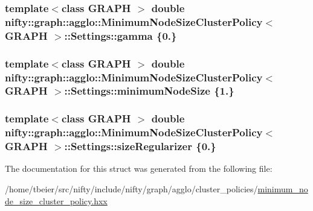 \subsubsection[{gamma}]{\setlength{\rightskip}{0pt plus 5cm}template$<$class G\+R\+A\+P\+H $>$ double {\bf nifty\+::graph\+::agglo\+::\+Minimum\+Node\+Size\+Cluster\+Policy}$<$ G\+R\+A\+P\+H $>$\+::Settings\+::gamma \{0.\}}\label{structnifty_1_1graph_1_1agglo_1_1MinimumNodeSizeClusterPolicy_1_1Settings_a86db1e646b71730b2b1af39153746035}
\hypertarget{structnifty_1_1graph_1_1agglo_1_1MinimumNodeSizeClusterPolicy_1_1Settings_ad25f32b2c05127471177047dadae1369}{}
\subsubsection[{minimum\+Node\+Size}]{\setlength{\rightskip}{0pt plus 5cm}template$<$class G\+R\+A\+P\+H $>$ double {\bf nifty\+::graph\+::agglo\+::\+Minimum\+Node\+Size\+Cluster\+Policy}$<$ G\+R\+A\+P\+H $>$\+::Settings\+::minimum\+Node\+Size \{1.\}}\label{structnifty_1_1graph_1_1agglo_1_1MinimumNodeSizeClusterPolicy_1_1Settings_ad25f32b2c05127471177047dadae1369}
\hypertarget{structnifty_1_1graph_1_1agglo_1_1MinimumNodeSizeClusterPolicy_1_1Settings_aba2de145c0fd50f2216b6e229e03d5ce}{}
\subsubsection[{size\+Regularizer}]{\setlength{\rightskip}{0pt plus 5cm}template$<$class G\+R\+A\+P\+H $>$ double {\bf nifty\+::graph\+::agglo\+::\+Minimum\+Node\+Size\+Cluster\+Policy}$<$ G\+R\+A\+P\+H $>$\+::Settings\+::size\+Regularizer \{0.\}}\label{structnifty_1_1graph_1_1agglo_1_1MinimumNodeSizeClusterPolicy_1_1Settings_aba2de145c0fd50f2216b6e229e03d5ce}


The documentation for this struct was generated from the following file\+:\begin{DoxyCompactItemize}
\item 
/home/tbeier/src/nifty/include/nifty/graph/agglo/cluster\+\_\+policies/\hyperlink{minimum__node__size__cluster__policy_8hxx}{minimum\+\_\+node\+\_\+size\+\_\+cluster\+\_\+policy.\+hxx}\end{DoxyCompactItemize}
